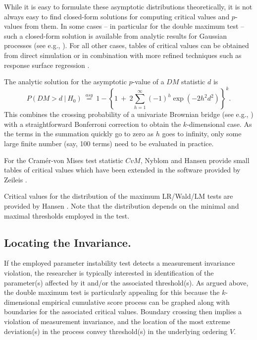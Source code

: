 \documentclass[man]{apa}
\begin{document}
While it is easy to formulate these asymptotic distributions theoretically,
it is not always easy to find closed-form solutions for computing critical
values and $p$-values from them. In some cases -- in particular for the double maximum test --
such a closed-form solution is available from analytic results for Gaussian
processes (see e.g., ). For all other cases, tables of critical
values can be obtained from direct simulation \cite{Zei06} or in combination with
more refined techniques such as response surface regression \cite{Han97}.

The analytic solution for the asymptotic $p$-value of a $\mathit{DM}$ statistic
$d$ is
\begin{equation}
    \label{eq:absmax_p}
        P(\mathit{DM} > d ~|~ H_0) ~\overset{asy}{=}~ 1 - \left\{1 ~+~ 2 \sum_{h = 1}^{\infty} (-1)^h \exp(-2 h^2 d^2) \right\}^k.
\end{equation}
This combines the crossing probability of a univariate Brownian bridge
(see e.g., ) with a straightforward Bonferroni
correction to obtain the $k$-dimensional case. As the terms in the summation
quickly go to zero as $h$ goes to infinity, only some large finite
number (say, 100 terms) need to be evaluated in practice.

For the Cram\'{e}r-von Mises test statistic $\mathit{CvM}$, Nyblom \citeyear{Nyb89}
and Hansen \citeyear{Han92} provide small tables of critical values which
have been extended in the software provided by Zeileis \citeyear{Zei06}.

Critical values for the distribution of the maximum LR/Wald/LM tests
are provided by Hansen \citeyear{Han97}. Note that the distribution depends on
the minimal and maximal thresholds employed in the test.


\subsection{Locating the Invariance.}

If the employed parameter instability test detects a measurement invariance violation,
the researcher is typically interested in identification of the parameter(s) affected
by it and/or the associated threshold(s). As argued above, the double maximum test
is particularly appealing for this because the $k$-dimensional empirical cumulative
score process can be graphed along with boundaries for the associated critical values.
Boundary crossing then implies a violation of measurement invariance, and the location of
the most extreme deviation(s) in the process convey threshold(s) in the underlying
ordering $V$.
\end{document}
